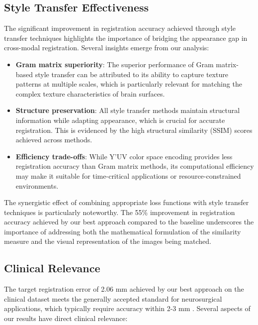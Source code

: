 \subsection{Style Transfer Effectiveness}

The significant improvement in registration accuracy achieved through style transfer techniques highlights the importance of bridging the appearance gap in cross-modal registration. Several insights emerge from our analysis:

\begin{itemize}
    \item \textbf{Gram matrix superiority}: The superior performance of Gram matrix-based style transfer can be attributed to its ability to capture texture patterns at multiple scales, which is particularly relevant for matching the complex texture characteristics of brain surfaces.
    
    \item \textbf{Structure preservation}: All style transfer methods maintain structural information while adapting appearance, which is crucial for accurate registration. This is evidenced by the high structural similarity (SSIM) scores achieved across methods.
    
    \item \textbf{Efficiency trade-offs}: While Y'UV color space encoding provides less registration accuracy than Gram matrix methods, its computational efficiency may make it suitable for time-critical applications or resource-constrained environments.
\end{itemize}

The synergistic effect of combining appropriate loss functions with style transfer techniques is particularly noteworthy. The 55\% improvement in registration accuracy achieved by our best approach compared to the baseline underscores the importance of addressing both the mathematical formulation of the similarity measure and the visual representation of the images being matched.

\subsection{Clinical Relevance}

The target registration error of 2.06 mm achieved by our best approach on the clinical dataset meets the generally accepted standard for neurosurgical applications, which typically require accuracy within 2-3 mm \parencite{navab2015surgical}. Several aspects of our results have direct clinical relevance:


